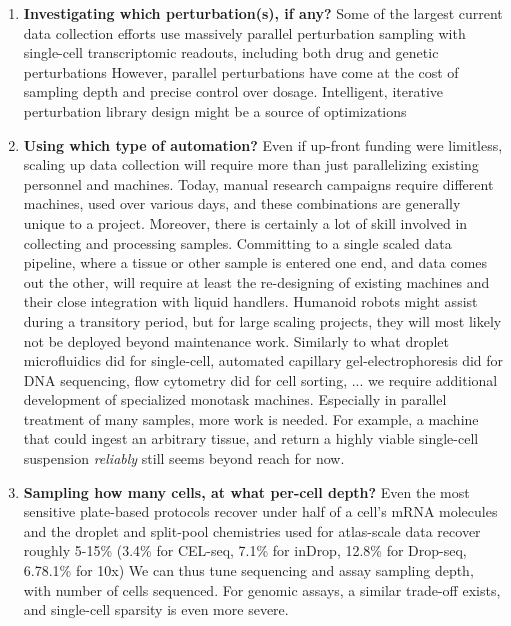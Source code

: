 \begin{enumerate}[noitemsep]
\item \textbf{Investigating which perturbation(s), if any?} Some of the largest current data collection efforts use massively parallel perturbation sampling with single-cell transcriptomic readouts, including both drug and genetic perturbations However, parallel perturbations have come at the cost of sampling depth and precise control over dosage. Intelligent, iterative perturbation library design might be a source of optimizations

\item \textbf{Using which type of automation?} Even if up-front funding were limitless, scaling up data collection will require more than just parallelizing existing personnel and machines. Today, manual research campaigns require different machines, used over various days, and these combinations are generally unique to a project. Moreover, there is certainly a lot of skill involved in collecting and processing samples. Committing to a single scaled data pipeline, where a tissue or other sample is entered one end, and data comes out the other, will require at least the re-designing of existing machines and their close integration with liquid handlers. Humanoid robots might assist during a transitory period, but for large scaling projects, they will most likely not be deployed beyond maintenance work. Similarly to what droplet microfluidics did for single-cell, automated capillary gel-electrophoresis did for DNA sequencing, flow cytometry did for cell sorting, ... we require additional development of specialized monotask machines. Especially in parallel treatment of many samples, more work is needed. For example, a machine that could ingest an arbitrary tissue, and return a highly viable single-cell suspension \textit{reliably} still seems beyond reach for now.

\item \textbf{Sampling how many cells, at what per-cell depth?} Even the most sensitive plate-based protocols recover under half of a cell's mRNA molecules and the droplet and split-pool chemistries used for atlas-scale data recover roughly 5-15\% (3.4\% for CEL-seq, 7.1\% for inDrop, 12.8\% for Drop-seq, 6.7\textendash{}8.1\% for 10x) We can thus tune sequencing and assay sampling depth, with number of cells sequenced. For genomic assays, a similar trade-off exists, and single-cell sparsity is even more severe.

\end{enumerate}

